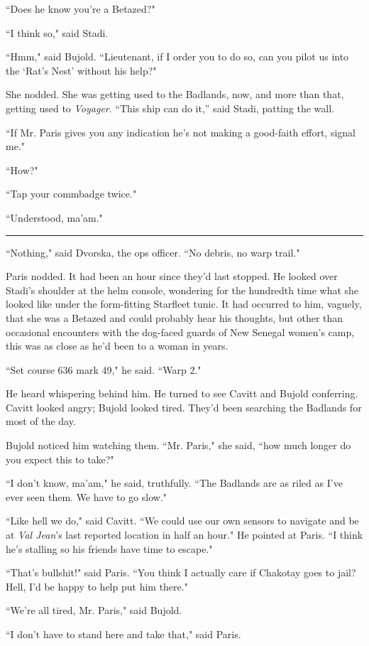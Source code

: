 \documentclass[twoside,letterpaper,12pt]{memoir}
\begin{document}
``Does he know you're a Betazed?"

``I think so," said Stadi.

``Hmm," said Bujold. ``Lieutenant, if I order you to do so, can you pilot us into the ‘Rat’s Nest’ without his help?"

She nodded. She was getting used to the Badlands, now, and more than that, getting used to \textit{Voyager}. ``This ship can do it,'' said Stadi, patting the wall.

``If Mr. Paris gives you any indication he's not making a good-faith effort, signal me."

``How?"

``Tap your commbadge twice."

``Understood, ma'am."

\fancybreak{\rule{3cm}{0.4 pt}}
``Nothing," said Dvorska, the ops officer. ``No debris, no warp trail."

Paris nodded. It had been an hour since they'd last stopped. He looked over Stadi's shoulder at the helm console, wondering for the hundredth time what she looked like under the form-fitting Starfleet tunic. It had occurred to him, vaguely, that she was a Betazed and could probably hear his thoughts, but other than occasional encounters with the dog-faced guards of New Senegal women's camp, this was as close as he'd been to a woman in years.

``Set course 636 mark 49," he said. ``Warp 2."

He heard whispering behind him. He turned to see Cavitt and Bujold conferring. Cavitt looked angry; Bujold looked tired. They'd been searching the Badlands for most of the day.

Bujold noticed him watching them. ``Mr. Paris," she said, ``how much longer do you expect this to take?"

``I don't know, ma'am," he said, truthfully. ``The Badlands are as riled as I've ever seen them. We have to go slow."

``Like hell we do," said Cavitt. ``We could use our own sensors to navigate and be at \textit{Val Jean}'s last reported location in half an hour." He pointed at Paris. ``I think he’s stalling so his friends have time to escape."

``That's bullshit!" said Paris. ``You think I actually care if Chakotay goes to jail? Hell, I'd be happy to help put him there."

``We're all tired, Mr. Paris," said Bujold.

``I don't have to stand here and take that," said Paris.
\end{document}
